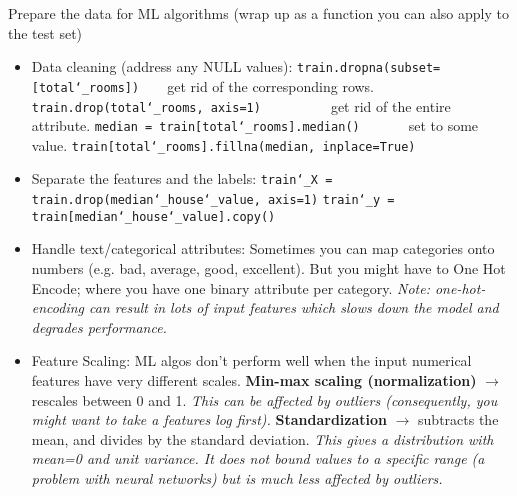 Prepare the data for ML algorithms (wrap up as a function you can also apply to the test set)
\vspace{-3.0mm}
\begin{itemize}
\item
Data cleaning (address any NULL values):\newline
\texttt{train.dropna(subset=[\textquotesingle total\char`_rooms\textquotesingle])}~~~~get rid of the corresponding rows.\newline
\texttt{train.drop(\textquotesingle total\char`_rooms\textquotesingle, axis=1)}~~~~~~~~~~get rid of the entire attribute.\newline
\texttt{median = train[\textquotesingle total\char`_rooms\textquotesingle].median()}~~~~~~~set to some value.\newline
\texttt{train[\textquotesingle total\char`_rooms\textquotesingle].fillna(median, inplace=True)}
\item
Separate the features and the labels:\newline
\texttt{train\char`_X = train.drop(\textquotesingle median\char`_house\char`_value\textquotesingle, axis=1)}\newline
\texttt{train\char`_y = train[\textquotesingle median\char`_house\char`_value\textquotesingle].copy()}
\item
Handle text/categorical attributes:\newline
Sometimes you can map categories onto numbers (e.g. bad, average, good, excellent).\newline
But you might have to One Hot Encode;
where you have one binary attribute per category.\newline
\textit{Note: one-hot-encoding can result in lots of input features
which slows down the model and degrades performance.}
\item
Feature Scaling:\newline
ML algos don't perform well when the input numerical features have very different scales.
\textbf{Min-max scaling (normalization)} $\rightarrow$ rescales between 0 and 1.\newline
\textit{This can be affected by outliers (consequently, you might want to take a features log first).}\newline
\textbf{Standardization} $\rightarrow$ subtracts the mean, and divides by the standard deviation.\newline
\textit{This gives a distribution with mean=0 and unit variance.
It does not bound values to a specific range (a problem with neural networks)
but is much less affected by outliers.}\newline
\end{itemize}


